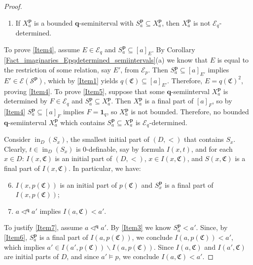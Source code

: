 \documentclass{amsart}
\theoremstyle{definition}
\theoremstyle{definition}
\newcommand{\Mon}{\mathfrak C}
\DeclareMathOperator{\supin}{in}
\begin{document}
\begin{proof}
\begin{enumerate}[(1)]
    \item\label{Item5} If $X^{\mathbf p}_a$ is a bounded $\mathbf q$-seminiterval with $S^{\mathbf p}_a\subseteq X^{\mathbf p}_a$, then $X^{\mathbf p}_a$ is not $\mathcal E_q$-determined.  
\end{enumerate}
To prove \ref{Item4}, assume $E\in \mathcal E_q$ and $S^{\mathbf p}_a\subseteq [a]_E$. By Corollary \ref{Fact_imaginaries_Epqdetermined_semiintervals}(a) we know that $E$ is equal to the restriction of some relation, say $E'$, from $\mathcal E_p$. Then $S^{\mathbf p}_a\subseteq [a]_{E'}$ implies $E'\in \mathcal E (\mathcal S^{\mathbf p})$, which by \ref{Item1} yields $q(\Mon)\subseteq [a]_{E'}$. Therefore, $E=q(\Mon)^2$, proving \ref{Item4}. To prove \ref{Item5}, suppose that some $\mathbf q$-semiinterval $X^{\mathbf p}_a$ is determined by $F\in \mathcal E_q$ and $S^{\mathbf p}_a\subseteq X^{\mathbf p}_a$. Then $X^{\mathbf p}_a$ is a final part of $[a]_F$, so by \ref{Item4} $S^{\mathbf p}_a\subseteq [a]_F$ implies $F=\mathbf 1_q$, so $X^{\mathbf p}_a$ is not bounded. 
Therefore, no bounded $\mathbf q$-semiinterval $X^{\mathbf p}_a$ which contains $S^{\mathbf p}_a\subseteq X^{\mathbf p}_a$ is $\mathcal E_q$-determined. 

\smallskip 
Consider $\supin_D(S_x)$, the smallest initial part of $(D,<)$ that contains $S_x$. Clearly, $t\in \supin_D(S_x)$ is $0$-definable, say by formula $I(x,t)$, and for each $x\in D$: $I(x,\Mon)$ is an initial part of $(D,<)$, $x\in I(x,\Mon)$, and $S(x,\Mon)$ is a final part of $I(x,\Mon)$. In particular, we have:
\begin{enumerate}[(1)]
\setcounter{enumi}{5} 
\item\label{Item6} $I(x,p(\Mon))$ is an initial part of $p(\Mon)$ and $S^{\mathbf p}_x$ is a final part of $I(x,p(\Mon))$;
\item\label{Item7} $a\triangleleft^\mathbf q a'$ implies $I(a,\Mon)<a'$.
\end{enumerate}
To justify \ref{Item7}, assume $a\triangleleft^\mathbf q a'$. By \ref{Item3} we know $S^{\mathbf p}_a<a'$. Since, by \ref{Item6}, $S^{\mathbf p}_a$ is a final part of $I(a,p(\Mon))$, we conclude $I(a,p(\Mon))<a'$, which implies $a'\in I(a',p(\Mon))\smallsetminus I(a,p(\Mon))$. Since $I(a,\Mon)$ and $I(a',\Mon)$ are initial parts of $D$, and since $a'\models p$, we conclude $I(a,\Mon)<a'$. 


\end{proof}
\end{document}
